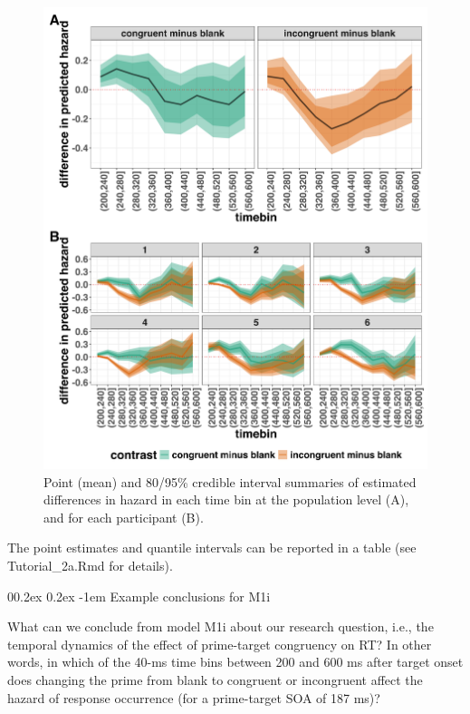 \documentclass[
  man, donotrepeattitle,floatsintext]{apa6}
\makeatletter
\let\oldparagraph\paragraph
\renewcommand{\paragraph}[1]{\oldparagraph{#1}\mbox{}}
\renewcommand{\paragraph}{\@startsection{paragraph}{4}{\parindent}%
  {0\baselineskip \@plus 0.2ex \@minus 0.2ex}%
  {-1em}%
  {\normalfont\normalsize\bfseries\itshape\typesectitle}}
\makeatother
\begin{document}
\begin{figure}[H]

{\centering \includegraphics[width=0.8\linewidth,height=0.67\textheight,]{../Tutorial_2_Bayesian/figures/M1i_ame_combined} 

}

\caption{Point (mean) and 80/95\% credible interval summaries of estimated differences in hazard in each time bin at the population level (A), and for each participant (B).}\label{fig:plot-grand-ame-effects}
\end{figure}

The point estimates and quantile intervals can be reported in a table (see Tutorial\_2a.Rmd for details).

\paragraph{Example conclusions for M1i}\label{example-conclusions-for-m1i}

What can we conclude from model M1i about our research question, i.e., the temporal dynamics of the effect of prime-target congruency on RT? In other words, in which of the 40-ms time bins between 200 and 600 ms after target onset does changing the prime from blank to congruent or incongruent affect the hazard of response occurrence (for a prime-target SOA of 187 ms)?
\end{document}
